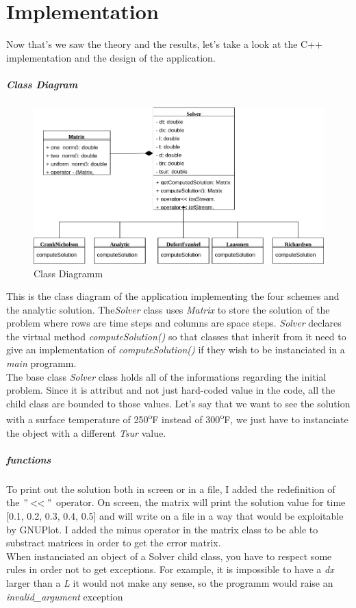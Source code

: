 \documentclass[12pt, a4paper]{report}
\begin{document}
\chapter{Implementation}
Now that's we saw the theory and the results, let's take a look at the C++ implementation and the design of the application.
\paragraph{Class Diagram}
\begin{figure}[h]
\centering
\includegraphics[scale=0.5]{ClassDiagram.png}
\caption{Class Diagramm}
\end{figure}

This is the class diagram of the application implementing the four schemes and the analytic solution.  The\textit{Solver} class uses \textit{Matrix} to store the solution of the problem where rows are time steps and columns are space steps. \textit{Solver} declares the virtual method \textit{computeSolution()} so that classes that inherit from it need to give an implementation of \textit{computeSolution()} if they wish to be instanciated in a \textit{main} programm.\\
The base class \textit{Solver} class holds all of the informations regarding the initial problem. Since it is attribut and not just hard-coded value in the code, all the child class are bounded to those values. Let's say that we want to see the solution with a surface temperature of 250\textsuperscript{o}F instead of 300\textsuperscript{o}F, we just have to instanciate the object with a different \textit{Tsur} value.
\paragraph{functions}
To print out the solution both in screen or in a file, I added the redefinition of the $"<<"$ operator. On screen, the matrix will print the solution value for time [0.1, 0.2, 0.3, 0.4, 0.5] and will write on a file in a way that would be exploitable by GNUPlot.
I added the minus operator in the matrix class to be able to substract matrices in order to get the error matrix. \\When instanciated an object of a Solver child class, you have to respect some rules in order not to get exceptions. For example, it is impossible to have a \textit{dx} larger than a \textit{L} it would not make any sense, so the programm would raise an \textit{invalid\_argument} exception
\end{document}
